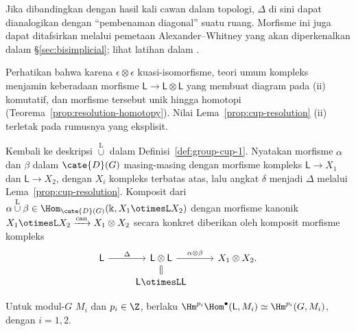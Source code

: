 Jika dibandingkan dengan hasil kali cawan dalam topologi, $\Delta$ di sini
dapat dianalogikan dengan ``pembenaman diagonal'' suatu ruang. Morfisme ini juga
dapat ditafsirkan melalui pemetaan Alexander--Whitney yang akan diperkenalkan
dalam \S\ref{sec:bisimplicial}; lihat latihan dalam .

Perhatikan bahwa karena $\epsilon\otimes\epsilon$ kuasi-isomorfisme, teori umum
kompleks menjamin keberadaan morfisme
$\mathsf{L}\to\mathsf{L}\otimes\mathsf{L}$ yang membuat diagram pada (ii)
komutatif, dan morfisme tersebut unik hingga homotopi
(Teorema~\ref{prop:resolution-homotopy}). Nilai
Lema~\ref{prop:cup-resolution} (ii) terletak pada rumusnya yang eksplisit.

Kembali ke deskripsi $\overset{\mathrm{L}}{\cup}$ dalam
Definisi~\ref{def:group-cup-1}. Nyatakan morfisme $\alpha$ dan $\beta$ dalam
$\cate{D}(G)$ masing-masing dengan morfisme kompleks
$\mathsf{L}\to X_1$ dan $\mathsf{L}\to X_2$, dengan $X_i$ kompleks terbatas
atas, lalu angkat $\delta$ menjadi $\Delta$ melalui
Lema~\ref{prop:cup-resolution}. Komposit dari
$\alpha\overset{\mathrm{L}}{\cup}\beta
\in\Hom_{\cate{D}(G)}(\Bbbk,X_1\otimesL X_2)$ dengan morfisme kanonik
$X_1\otimesL X_2\xrightarrow{\text{can}}X_1\otimes X_2$ secara konkret
diberikan oleh komposit morfisme kompleks
\[\begin{tikzcd}[row sep=small]
	\mathsf{L} \arrow[r, "\Delta"] & \mathsf{L} \otimes \mathsf{L} \arrow[r, "{\alpha \otimes \beta}"] & X_1 \otimes X_2. \\
	& \mathsf{L} \otimesL \mathsf{L} \arrow[equal, u] &
\end{tikzcd}\]

Untuk modul-$G$ $M_i$ dan $p_i\in\Z$, berlaku
$\Hm^{p_i}\Hom^\bullet(\mathsf{L},M_i)\simeq\Hm^{p_i}(G,M_i)$, dengan
$i=1,2$.

